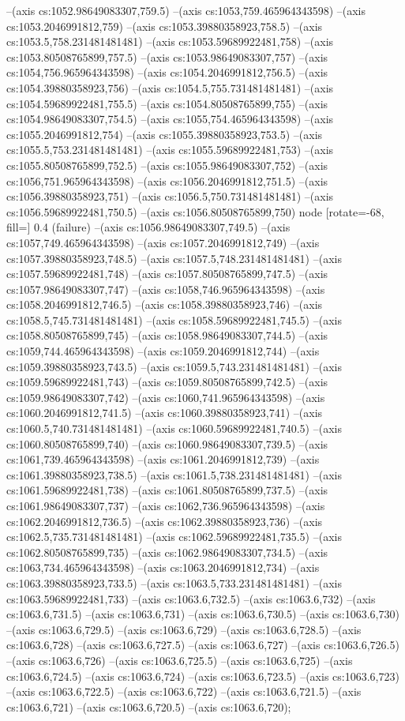 --(axis cs:1052.98649083307,759.5)
--(axis cs:1053,759.465964343598)
--(axis cs:1053.2046991812,759)
--(axis cs:1053.39880358923,758.5)
--(axis cs:1053.5,758.231481481481)
--(axis cs:1053.59689922481,758)
--(axis cs:1053.80508765899,757.5)
--(axis cs:1053.98649083307,757)
--(axis cs:1054,756.965964343598)
--(axis cs:1054.2046991812,756.5)
--(axis cs:1054.39880358923,756)
--(axis cs:1054.5,755.731481481481)
--(axis cs:1054.59689922481,755.5)
--(axis cs:1054.80508765899,755)
--(axis cs:1054.98649083307,754.5)
--(axis cs:1055,754.465964343598)
--(axis cs:1055.2046991812,754)
--(axis cs:1055.39880358923,753.5)
--(axis cs:1055.5,753.231481481481)
--(axis cs:1055.59689922481,753)
--(axis cs:1055.80508765899,752.5)
--(axis cs:1055.98649083307,752)
--(axis cs:1056,751.965964343598)
--(axis cs:1056.2046991812,751.5)
--(axis cs:1056.39880358923,751)
--(axis cs:1056.5,750.731481481481)
--(axis cs:1056.59689922481,750.5)
--(axis cs:1056.80508765899,750) node [rotate=-68, fill=\bgcol] {0.4 (failure)}
--(axis cs:1056.98649083307,749.5)
--(axis cs:1057,749.465964343598)
--(axis cs:1057.2046991812,749)
--(axis cs:1057.39880358923,748.5)
--(axis cs:1057.5,748.231481481481)
--(axis cs:1057.59689922481,748)
--(axis cs:1057.80508765899,747.5)
--(axis cs:1057.98649083307,747)
--(axis cs:1058,746.965964343598)
--(axis cs:1058.2046991812,746.5)
--(axis cs:1058.39880358923,746)
--(axis cs:1058.5,745.731481481481)
--(axis cs:1058.59689922481,745.5)
--(axis cs:1058.80508765899,745)
--(axis cs:1058.98649083307,744.5)
--(axis cs:1059,744.465964343598)
--(axis cs:1059.2046991812,744)
--(axis cs:1059.39880358923,743.5)
--(axis cs:1059.5,743.231481481481)
--(axis cs:1059.59689922481,743)
--(axis cs:1059.80508765899,742.5)
--(axis cs:1059.98649083307,742)
--(axis cs:1060,741.965964343598)
--(axis cs:1060.2046991812,741.5)
--(axis cs:1060.39880358923,741)
--(axis cs:1060.5,740.731481481481)
--(axis cs:1060.59689922481,740.5)
--(axis cs:1060.80508765899,740)
--(axis cs:1060.98649083307,739.5)
--(axis cs:1061,739.465964343598)
--(axis cs:1061.2046991812,739)
--(axis cs:1061.39880358923,738.5)
--(axis cs:1061.5,738.231481481481)
--(axis cs:1061.59689922481,738)
--(axis cs:1061.80508765899,737.5)
--(axis cs:1061.98649083307,737)
--(axis cs:1062,736.965964343598)
--(axis cs:1062.2046991812,736.5)
--(axis cs:1062.39880358923,736)
--(axis cs:1062.5,735.731481481481)
--(axis cs:1062.59689922481,735.5)
--(axis cs:1062.80508765899,735)
--(axis cs:1062.98649083307,734.5)
--(axis cs:1063,734.465964343598)
--(axis cs:1063.2046991812,734)
--(axis cs:1063.39880358923,733.5)
--(axis cs:1063.5,733.231481481481)
--(axis cs:1063.59689922481,733)
--(axis cs:1063.6,732.5)
--(axis cs:1063.6,732)
--(axis cs:1063.6,731.5)
--(axis cs:1063.6,731)
--(axis cs:1063.6,730.5)
--(axis cs:1063.6,730)
--(axis cs:1063.6,729.5)
--(axis cs:1063.6,729)
--(axis cs:1063.6,728.5)
--(axis cs:1063.6,728)
--(axis cs:1063.6,727.5)
--(axis cs:1063.6,727)
--(axis cs:1063.6,726.5)
--(axis cs:1063.6,726)
--(axis cs:1063.6,725.5)
--(axis cs:1063.6,725)
--(axis cs:1063.6,724.5)
--(axis cs:1063.6,724)
--(axis cs:1063.6,723.5)
--(axis cs:1063.6,723)
--(axis cs:1063.6,722.5)
--(axis cs:1063.6,722)
--(axis cs:1063.6,721.5)
--(axis cs:1063.6,721)
--(axis cs:1063.6,720.5)
--(axis cs:1063.6,720);

